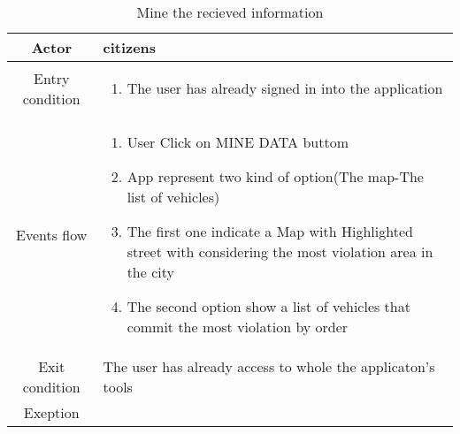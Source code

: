 \documentclass{article}
\begin{document}
			\begin{table} [H]
		\begin{center}
		\caption{Mine the recieved information}
		\begin{tabular}{|c|p{8cm}|}
			\hline
			Actor&citizens\\
			\hline
			Entry condition&
				\begin{enumerate}
					\item The user has already signed in into the application
				\end{enumerate}\\
			\hline
			 Events flow&
			\begin{enumerate}
			\item User Click on MINE DATA buttom 			
			\item App represent two kind of option(The map-The list of vehicles)
			\item The first one indicate a Map with Highlighted street with considering the most violation area in the city
			\item The second option show a list of vehicles that commit the most violation by order
			\end{enumerate}\\
			\hline
			Exit condition& The user has already access to whole the applicaton's tools\\
			\hline
			Exeption&
		\\
			\hline
		\end{tabular}
				
		\end{center}


		\end{table} 
\end{document}
